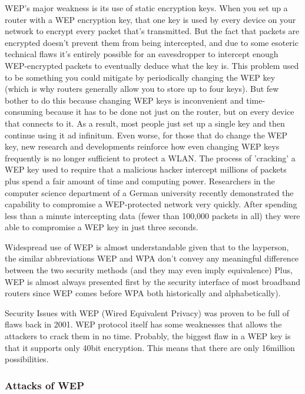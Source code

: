 \documentclass[a4paper,12pt,pagesize,headsepline,bibtotoc,titlepage]{scrartcl}
\begin{document}
WEP's major weakness is its use of static encryption keys. When you set up a router with a WEP encryption key, that one key is used by every device on your network to encrypt every packet that's transmitted. But the fact that packets are encrypted doesn't prevent them from being intercepted, and due to some esoteric technical flaws it's entirely possible for an eavesdropper to intercept enough WEP-encrypted packets to eventually deduce what the key is.
This problem used to be something you could mitigate by periodically changing the WEP key (which is why routers generally allow you to store up to four keys). But few bother to do this because changing WEP keys is inconvenient and time-consuming because it has to be done not just on the router, but on every device that connects to it. As a result, most people just set up a single key and then continue using it ad infinitum.
Even worse, for those that do change the WEP key, new research and developments reinforce how even changing WEP keys frequently is no longer sufficient to protect a WLAN. The process of 'cracking' a WEP key used to require that a malicious hacker intercept millions of packets plus spend a fair amount of time and computing power. Researchers in the computer science department of a German university recently demonstrated the capability to compromise a WEP-protected network very quickly. After spending less than a minute intercepting data (fewer than 100,000 packets in all) they were able to compromise a WEP key in just three seconds.

Widespread use of WEP is almost understandable given that to the layperson, the similar abbreviations WEP and WPA don't convey any meaningful difference between the two security methods (and they may even imply equivalence) Plus, WEP is almost always presented first by the security interface of most broadband routers since WEP comes before WPA both historically and alphabetically).

Security Issues with WEP (Wired Equivalent Privacy) was proven to be full of flaws back in 2001. WEP protocol itself has some weaknesses that allows the attackers to crack them in no time. Probably, the biggest flaw in a WEP key is that it supports only 40bit encryption. This means that there are only 16million possibilities. 

\subsubsection{Attacks of WEP}
\end{document}
